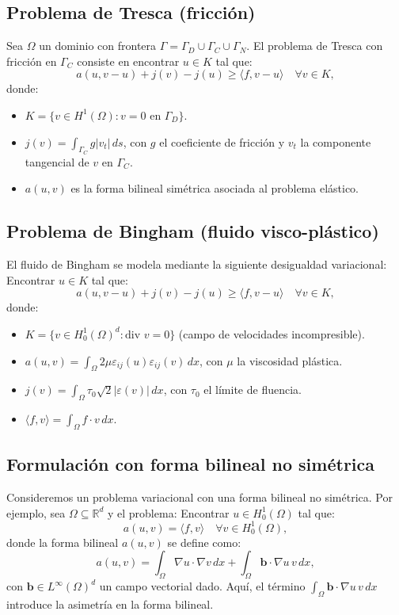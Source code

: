 \documentclass[12pt]{book}
\theoremstyle{definition}
\theoremstyle{plain}
\theoremstyle{remark}
\begin{document}
\subsection{Problema de Tresca (fricción)}
Sea \( \Omega \) un dominio con frontera \( \Gamma = \Gamma_D \cup \Gamma_C \cup \Gamma_N \). El problema de Tresca con fricción en \( \Gamma_C \) consiste en encontrar \( u \in K \) tal que:
\[
a(u, v - u) + j(v) - j(u) \geq \langle f, v - u \rangle \quad \forall v \in K,
\]
donde:
\begin{itemize}
    \item \( K = \{ v \in H^1(\Omega) \colon v = 0 \text{ en } \Gamma_D \} \).
    \item \( j(v) = \int_{\Gamma_C} g |v_t| \, ds \), con \( g \) el coeficiente de fricción y \( v_t \) la componente tangencial de \( v \) en \( \Gamma_C \).
    \item \( a(u, v) \) es la forma bilineal simétrica asociada al problema elástico.
\end{itemize}

\subsection{Problema de Bingham (fluido visco-plástico)}
El fluido de Bingham se modela mediante la siguiente desigualdad variacional:
Encontrar \( u \in K \) tal que:
\[
a(u, v - u) + j(v) - j(u) \geq \langle f, v - u \rangle \quad \forall v \in K,
\]
donde:
\begin{itemize}
    \item \( K = \{ v \in H^1_0(\Omega)^d \colon \text{div } v = 0 \} \) (campo de velocidades incompresible).
    \item \( a(u, v) = \int_\Omega 2\mu \varepsilon_{ij}(u) \varepsilon_{ij}(v) \, dx \), con \( \mu \) la viscosidad plástica.
    \item \( j(v) = \int_\Omega \tau_0 \sqrt{2} |\varepsilon(v)| \, dx \), con \( \tau_0 \) el límite de fluencia.
    \item \( \langle f, v \rangle = \int_\Omega f \cdot v \, dx \).
\end{itemize}

\subsection{Formulación con forma bilineal no simétrica}
Consideremos un problema variacional con una forma bilineal no simétrica. Por ejemplo, sea \( \Omega \subseteq \mathbb{R}^d \) y el problema:
Encontrar \( u \in H^1_0(\Omega) \) tal que:
\[
a(u, v) = \langle f, v \rangle \quad \forall v \in H^1_0(\Omega),
\]
donde la forma bilineal \( a(u, v) \) se define como:
\[
a(u, v) = \int_\Omega \nabla u \cdot \nabla v \, dx + \int_\Omega \mathbf{b} \cdot \nabla u \, v \, dx,
\]
con \( \mathbf{b} \in L^\infty(\Omega)^d \) un campo vectorial dado.
Aquí, el término \( \int_\Omega \mathbf{b} \cdot \nabla u \, v \, dx \) introduce la asimetría en la forma bilineal.
\end{document}
